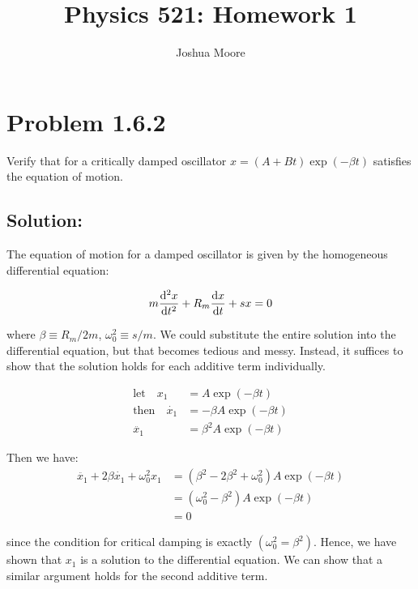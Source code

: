 \documentclass{article}
\title{
      \vspace{2in}
      \textmd{\textbf{Physics 521: Homework 1}}
}
\author{Joshua Moore}
\begin{document}

\maketitle
\newpage

%
%

\section*{Problem 1.6.2}

Verify that for a critically damped oscillator $x = (A +Bt)\exp(-\beta t)$ satisfies
the equation of motion.


\subsection*{Solution:}

The equation of motion for a damped oscillator is given by the homogeneous differential equation:

\[
  m \dv[2]{x}{t} + R_m \dv{x}{t} + s x = 0
\]

where $\beta \equiv R_m / 2m$, $\omega_{0}^2 \equiv s/m$. We could substitute the entire solution into
the differential equation, but that becomes tedious and messy. Instead, it suffices to show that the
solution holds for each additive term individually.

\[
  \begin{split}
    \text{let}\quad x_1 &= A \exp(-\beta t)
    \\
    \text{then}\quad\dot{x_1} &= -\beta A \exp(-\beta t)
    \\
    \ddot{x_1} &= \beta^2 A \exp(-\beta t)
  \end{split}
\]

Then we have:
\[
  \begin{split}
    \ddot{x_1} + 2 \beta \dot{x_1} + \omega_{0}^2 x_1 &= ( \beta^2 -2 \beta^2 +\omega_{0}^2 ) A \exp( -\beta t )
                                                      \\
                                                      &= ( \omega_{0}^2 -\beta^2 ) A \exp( -\beta t )
                                                      \\
                                                      &= 0
  \end{split}
\]

since the condition for critical damping is exactly $( \omega_{0}^2 = \beta^2 ).$ Hence, we have shown that
$x_1$ is a solution to the differential equation. We can show that a similar argument holds for the second additive term.
\end{document}
